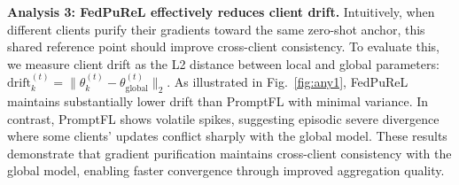 \documentclass[10pt,twocolumn,letterpaper]{article}
\begin{document}



\noindent \textbf{\hypertarget{analysis:3}{Analysis 3}: FedPuReL effectively reduces client drift.} 
Intuitively, when different clients purify their gradients toward the same zero-shot anchor, this shared reference point should improve cross-client consistency. To evaluate this, we measure client drift as the L2 distance between local and global parameters: $\text{drift}_k^{(t)} = \|\theta_k^{(t)} - \theta_{\text{global}}^{(t)}\|_2$. As illustrated in Fig.~\ref{fig:any1}, FedPuReL maintains substantially lower drift than PromptFL with minimal variance. In contrast, PromptFL shows volatile spikes, suggesting episodic severe divergence where some clients' updates conflict sharply with the global model. These results demonstrate that gradient purification maintains cross-client consistency with the global model, enabling faster convergence through improved aggregation quality.
\end{document}
